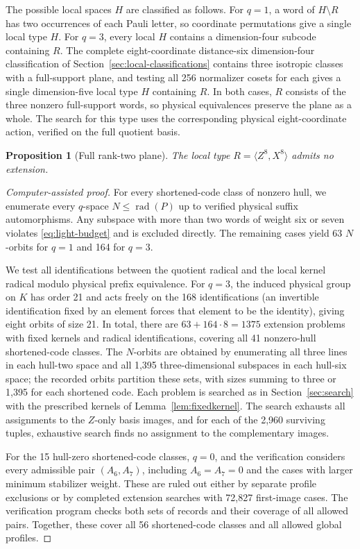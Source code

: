 \documentclass[11pt]{article}
\newtheorem{proposition}[theorem]{Proposition}
\theoremstyle{definition}
\theoremstyle{remark}
\newcommand{\rad}{\operatorname{rad}}
\begin{document}
The possible local spaces \(H\) are classified as follows. For \(q=1\),
a word of \(H\setminus R\) has two occurrences of each Pauli letter, so
coordinate permutations give a single local type \(H\). For \(q=3\),
every local \(H\) contains a dimension-four subcode containing \(R\).
The complete eight-coordinate distance-six dimension-four classification
of Section~\ref{sec:local-classifications} contains three isotropic
classes with a full-support plane, and testing all 256 normalizer cosets
for each gives a single dimension-five local type \(H\) containing
\(R\). In both cases, \(R\) consists of the three nonzero full-support
words, so physical equivalences preserve the plane as a whole. The
search for this type uses the corresponding physical eight-coordinate
action, verified on the full quotient basis.

\begin{proposition}[Full rank-two plane]\label{prop:17-plane}
The local type \(R=\langle Z^8,X^8\rangle\) admits no extension.
\end{proposition}
\begin{proof}[Computer-assisted proof]
For every shortened-code class of nonzero hull, we enumerate every
\(q\)-space \(N\leq\rad(P)\) up to verified physical suffix
automorphisms. Any subspace with more than two words of weight six or
seven violates \eqref{eq:light-budget} and is excluded directly. The
remaining cases yield 63 \(N\)-orbits for \(q=1\) and 164 for \(q=3\).

We test all identifications between the quotient radical and the local
kernel radical modulo physical prefix equivalence. For \(q=3\), the
induced physical group on \(K\) has order 21 and acts freely on the 168
identifications (an invertible identification fixed by an element forces
that element to be the identity), giving eight orbits of size 21. In
total, there are \(63+164\cdot8=1375\) extension problems with fixed
kernels and radical identifications, covering all 41 nonzero-hull
shortened-code classes. The \(N\)-orbits are obtained by enumerating all
three lines in each hull-two space and all 1,395 three-dimensional
subspaces in each hull-six space; the recorded orbits partition these
sets, with sizes summing to three or 1,395 for each shortened code. Each
problem is searched as in Section~\ref{sec:search} with the prescribed
kernels of Lemma~\ref{lem:fixedkernel}. The search exhausts all
assignments to the \(Z\)-only basis images, and for each of the 2,960
surviving tuples, exhaustive search finds no assignment to the
complementary images.

For the 15 hull-zero shortened-code classes, \(q=0\), and the
verification considers every admissible pair \((A_6,A_7)\), including
\(A_6=A_7=0\) and the cases with larger minimum stabilizer weight. These
are ruled out either by separate profile exclusions or by completed
extension searches with 72,827 first-image cases. The verification
program checks both sets of records and their coverage of all allowed
pairs. Together, these cover all 56 shortened-code classes and all
allowed global profiles.
\end{proof}
\end{document}
